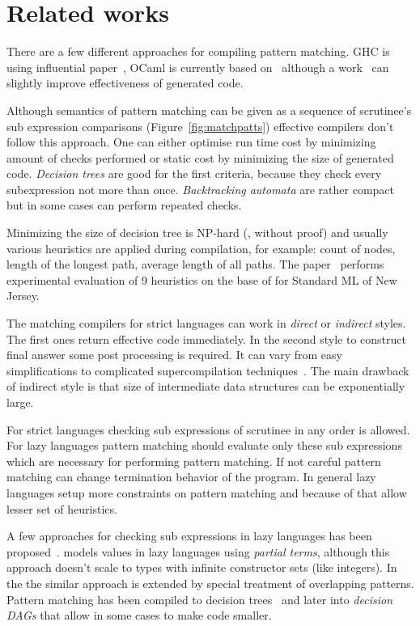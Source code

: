 \section{Related works}
\label{sec:related}

There are a few different approaches for compiling pattern matching. GHC is using influential paper~\cite{Jones1987}, OCaml is currently based on~\cite{maranget2001} although a work~\cite{maranget2008} can slightly improve effectiveness of generated code. 

Although semantics of pattern matching can be given as a sequence of scrutinee's sub expression comparisons (Figure~\ref{fig:matchpatts}) effective compilers don't follow this approach. One can either optimise run time cost by minimizing amount of checks performed or static cost by minimizing the size of generated code. \emph{Decision trees} are good for the first criteria, because they check every subexpression not more than once. \emph{Backtracking automata} are rather compact but in some cases can perform repeated checks.


Minimizing the size of decision tree is  NP-hard (\cite{baudinet1985tree}, without proof) and usually various heuristics are applied during compilation, for example: count of nodes, length of the longest path, average length of all paths. The paper~\cite{Scott2000WhenDM} performs experimental evaluation of 9  heuristics on the base of for Standard ML of New Jersey.


The matching compilers for strict languages can work in \emph{direct} or \emph{indirect} styles. The first ones return effective code immediately. In the second style to construct final answer some post processing is required. It can vary from easy simplifications to complicated supercompilation techniques~\cite{sestoft1996}. The main drawback of indirect style is that size of intermediate data structures can be exponentially large.

For strict languages checking  sub expressions of scrutinee in any order is allowed. For lazy languages pattern matching should evaluate only these sub expressions which are necessary for performing pattern matching. If not careful pattern matching can change termination behavior of the program.  In general lazy languages setup more constraints on pattern matching and because of that allow lesser set of heuristics.

A few approaches for checking sub expressions in lazy languages has been proposed~\cite{augustsson1985,laville1991}. \cite{laville1991} models values in lazy languages using \emph{partial terms}, although this approach doesn't scale to types with infinite constructor sets (like integers). In  the \cite{suarez1993} the similar approach is extended by special treatment of overlapping patterns. Pattern matching has been compiled to decision trees~\cite{maranget1992} and later \cite{maranget1992} into \emph{decision DAGs} that allow in some cases to make code smaller.

